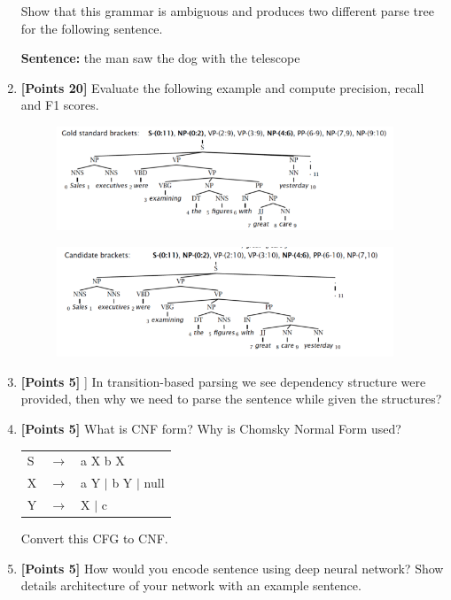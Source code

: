 \documentclass[12pt]{article}
\begin{document}
\begin{enumerate}
            Show that this grammar is ambiguous and produces two different parse
            tree for the following sentence.

            \textbf{Sentence:} the man saw the dog with the telescope

      \item \textbf{[Points 20]} Evaluate the following example and compute
            precision, recall and F1 scores.

            \begin{figure}[h]
                  \centering
                  \includegraphics[width=0.95\textwidth]{assets/test2/gold_standard_brackets.png}
            \end{figure}

            \begin{figure}[h]
                  \centering
                  \includegraphics[width=0.95\textwidth]{assets/test2/candidate_brackets.png}
            \end{figure}

      \item \textbf{[Points 5]} ] In transition-based parsing we see dependency
            structure were provided, then why we need to parse the sentence while
            given the structures?

      \item \textbf{[Points 5]} What is CNF form? Why is Chomsky Normal Form used?

            \begin{tabular}{lll}
                  S & $\rightarrow$ & a X b X              \\
                  X & $\rightarrow$ & a Y $|$ b Y $|$ null \\
                  Y & $\rightarrow$ & X $|$ c              \\
            \end{tabular}

            Convert this CFG to CNF.

      \item \textbf{[Points 5]} How would you encode sentence using deep neural
            network? Show details architecture of your network with an example
            sentence.
\end{enumerate}
\end{document}
